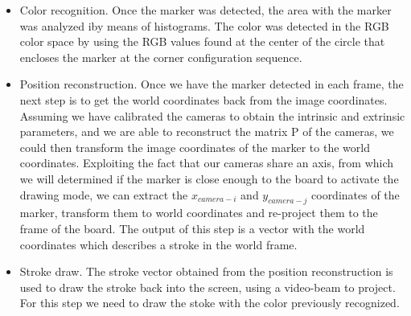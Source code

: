 \documentclass[a4paper,12pt]{article}
\begin{document}
\begin{itemize}
    \item Color recognition. Once the marker was detected, the area with the marker was analyzed iby means of histograms. The color was detected in the RGB color space by using the RGB values found at the center of the circle that encloses the marker at the corner configuration sequence. 
  
    \item Position reconstruction. Once we have the marker detected in each frame, the next step is to get the world coordinates back from the image coordinates. Assuming we have calibrated the cameras to obtain the intrinsic and extrinsic parameters, and we are able to reconstruct the matrix P of the cameras, we could then transform the image coordinates of the marker to the world coordinates. Exploiting the fact that our cameras share an axis, from which we will determined if the marker is close enough to the board to activate the drawing mode, we can extract the $x_{camera-i}$ and $y_{camera-j}$ coordinates of the marker, transform them to world coordinates and re-project them to the frame of the board. The output of this step is a vector with the world coordinates which describes a stroke in the world frame.
    \item Stroke draw. The stroke vector obtained from the position reconstruction is used to draw the stroke back into the screen, using a video-beam to project. For this step we need to draw the stoke with the color previously recognized.
\end{itemize}
\end{document}
